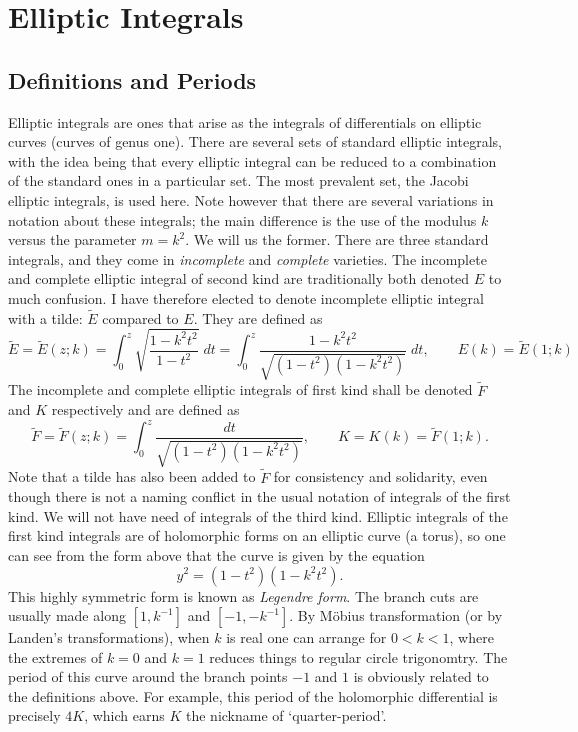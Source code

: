 
\section{Elliptic Integrals}
\label{sec:Elliptic Integrals}

\subsection{Definitions and Periods}
Elliptic integrals are ones that arise as the integrals of differentials on elliptic curves (curves of genus one). There are several sets of standard elliptic integrals, with the idea being that every elliptic integral can be reduced to a combination of the standard ones in a particular set. The most prevalent set, the Jacobi elliptic integrals, is used here. Note however that there are several variations in notation about these integrals; the main difference is the use of the modulus $k$ versus the parameter $m = k^2$. We will us the former. There are three standard integrals, and they come in {\it incomplete} and {\it complete} varieties. The incomplete and complete elliptic integral of second kind are traditionally both denoted $E$ to much confusion. I have therefore elected to denote incomplete elliptic integral with a tilde: $\tilde E$ compared to $E$. They are defined as
\[
\tilde E = \tilde E(z;k) = \int_0^z \sqrt{\frac{1-k^2 t^2}{1-t^2}} \;dt = \int_0^z \frac{1-k^2 t^2}{\sqrt{(1-t^2)(1-k^2 t^2)}}\;dt,
\qquad E(k) = \tilde E(1;k)
\]
The incomplete and complete elliptic integrals of first kind shall be denoted $\tilde F$ and $K$ respectively and are defined as
\[
\tilde F = \tilde F(z;k) = \int_0^z \frac{dt}{\sqrt{(1-t^2)(1-k^2 t^2)}},
\qquad K = K(k) = \tilde F(1;k).
\]
Note that a tilde has also been added to $\tilde F$ for consistency and solidarity, even though there is not a naming conflict in the usual notation of integrals of the first kind. We will not have need of integrals of the third kind. Elliptic integrals of the first kind integrals are of holomorphic forms on an elliptic curve (a torus), so one can see from the form above that the curve is given by the equation
\[
y^2 = (1-t^2)(1-k^2 t^2).
\]
This highly symmetric form is known as {\it Legendre form}. The branch cuts are usually made along $[1,k^{-1}]$ and $[-1,-k^{-1}]$. By M\"obius transformation (or by Landen's transformations), when $k$ is real one can arrange for $0< k < 1$, where the extremes of $k=0$ and $k=1$ reduces things to regular circle trigonomtry. The period of this curve around the branch points $-1$ and $1$ is obviously related to the definitions above. For example, this period of the holomorphic differential is precisely $4K$, which earns $K$ the nickname of `quarter-period'.

